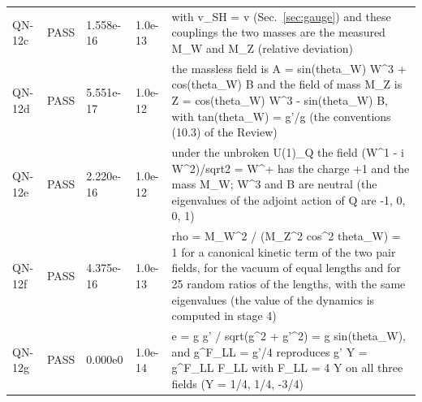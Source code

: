 \documentclass[aps,prd,onecolumn,superscriptaddress,nofootinbib,floatfix,longbibliography]{revtex4-2}
\begin{document}
\begin{longtable}{p{}p{}p{}p{}p{}}
QN-12c & PASS & 1.558e-16 & 1.0e-13 & with v\_SH = v (Sec.~\ref{sec:gauge}) and these couplings the two masses are the measured M\_W and M\_Z (relative deviation) \\
QN-12d & PASS & 5.551e-17 & 1.0e-12 & the massless field is A = sin(theta\_W) W\textasciicircum{}3 + cos(theta\_W) B and the field of mass M\_Z is Z = cos(theta\_W) W\textasciicircum{}3 - sin(theta\_W) B, with tan(theta\_W) = g'/g (the conventions (10.3) of the Review) \\
QN-12e & PASS & 2.220e-16 & 1.0e-12 & under the unbroken U(1)\_Q the field (W\textasciicircum{}1 - i W\textasciicircum{}2)/sqrt2 = W\textasciicircum{}+ has the charge +1 and the mass M\_W; W\textasciicircum{}3 and B are neutral (the eigenvalues of the adjoint action of Q are -1, 0, 0, 1) \\
QN-12f & PASS & 4.375e-16 & 1.0e-13 & rho = M\_W\textasciicircum{}2 / (M\_Z\textasciicircum{}2 cos\textasciicircum{}2 theta\_W) = 1 for a canonical kinetic term of the two pair fields, for the vacuum of equal lengths and for 25 random ratios of the lengths, with the same eigenvalues (the value of the dynamics is computed in stage 4) \\
QN-12g & PASS & 0.000e0 & 1.0e-14 & e = g g' / sqrt(g\textasciicircum{}2 + g'\textasciicircum{}2) = g sin(theta\_W), and g\textasciicircum{}F\_LL = g'/4 reproduces g' Y = g\textasciicircum{}F\_LL F\_LL with F\_LL = 4 Y on all three fields (Y = 1/4, 1/4, -3/4) \\
\end{longtable}
\endgroup
\end{document}
